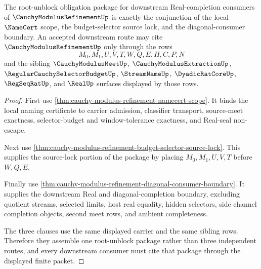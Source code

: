\begin{theorem}
\label{thm:cauchy-modulus-refinement-root-unblock-package}
The root-unblock obligation package for downstream Real-completion consumers of $\CauchyModulusRefinementUp$ is exactly the conjunction of the local $\NameCert$ scope, the budget-selector source lock, and the diagonal-consumer boundary. An accepted downstream route may cite $\CauchyModulusRefinementUp$ only through the rows
$$
M_0,M_1,U,V,T,W,Q,E,H,C,P,N
$$
and the sibling $\CauchyModulusMeetUp$, $\CauchyModulusExtractionUp$, $\RegularCauchySelectorBudgetUp$, $\StreamNameUp$, $\DyadicRatCoreUp$, $\RegSeqRatUp$, and $\RealUp$ surfaces displayed by those rows.
\end{theorem}
\begin{proof}
First use \autoref{thm:cauchy-modulus-refinement-namecert-scope}. It binds the local naming certificate to carrier admission, classifier transport, source-meet exactness, selector-budget and window-tolerance exactness, and Real-seal non-escape.

Next use \autoref{thm:cauchy-modulus-refinement-budget-selector-source-lock}. This supplies the source-lock portion of the package by placing $M_0,M_1,U,V,T$ before $W,Q,E$.

Finally use \autoref{thm:cauchy-modulus-refinement-diagonal-consumer-boundary}. It supplies the downstream Real and diagonal-completion boundary, excluding quotient streams, selected limits, host real equality, hidden selectors, side channel completion objects, second meet rows, and ambient completeness.

The three clauses use the same displayed carrier and the same sibling rows. Therefore they assemble one root-unblock package rather than three independent routes, and every downstream consumer must cite that package through the displayed finite packet.
\end{proof}








